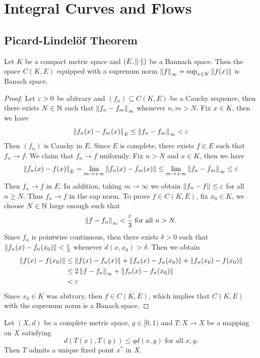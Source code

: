 \chapter{Integral Curves and Flows}
\section{Picard-Lindelöf Theorem}
\begin{lemma}
    Let $K$ be a compact metric space and $(E,\left\lVert \cdot \right\rVert)$ be a Bannach space. Then the space $C(K,E)$ equipped with a suprenum norm $\left\lVert f \right\rVert_{\infty} = \sup_{x \in K}\left\lVert f(x) \right\rVert$ is Banach space.
\end{lemma}
\begin{proof}
    Let $\varepsilon > 0$ be abitrary and $(f_n) \subseteq C(K,E)$ be a Cauchy sequence, then there exists $N \in \mathbb{N}$ such that $\left\lVert f_n - f_m \right\rVert_{\infty}$ whenever $n,m > N$. Fix $x \in K$, then we have 
    \[
        \left\lVert f_n(x) - f_m(x) \right\rVert_E \leq \left\lVert f_n - f_m \right\rVert_{\infty} < \varepsilon
    \]
    Then $(f_n)$ is Cauchy in $E$. Since $E$ is complete, there exists $f \in E$ such that $f_n \to f$. We claim that $f_n \to f$ uniformly. Fix $n > N$ and $x \in K$, then we have 
    \[
        \left\lVert f_n(x) - f(x) \right\rVert_{E} = \lim_{m \to +\infty}\left\lVert f_n(x) - f_m(x) \right\rVert\leq \lim_{m \to +\infty}\left\lVert f_n - f_m \right\rVert_{\infty} \leq \varepsilon
    \]
    Then $f_n \to f$ in $E$. In addition, taking $m \to \infty$ we obtain $\left\lVert f_n - f \right\rVert \leq \varepsilon$ for all $n \geq N$. Thus $f_n \to f$ in the sup norm. To prove $f \in C(K,E)$, fix $x_0 \in K$, we choose $N \in \mathbb{N}$ large enough such that 
    \[
        \left\lVert f -f_n \right\rVert_{\infty} < \frac{\varepsilon}{3} \text{ for all }n > N.
    \]
    Since $f_n$ is pointwise continuous, then there exists $\delta > 0$ such that $\left\lVert f_n(x) - f_n(x_0) \right\rVert< \frac{\varepsilon}{3}$ whenever $d(x,x_0) > \delta$. Then we obtain 
    \begin{align*}
        \left\lVert f(x) - f(x_0) \right\rVert &\leq \left\lVert f(x) - f_n(x) \right\rVert + \left\lVert f_n(x) - f_n(x_0) \right\rVert + \left\lVert f_n(x_0) - f(x_0) \right\rVert\\
        &\leq 2\left\lVert f - f_n \right\rVert_\infty + \left\lVert f_n(x) - f_n(x_0) \right\rVert\\
        &< \varepsilon
    \end{align*}
    Since $x_0 \in K$ was abitrary, then $f \in C(K,E)$, which implies that $C(K,E)$ with the suprenum norm is a Banach space.
\end{proof}
\begin{theorem}
    Let $(X,d)$ be a complete metric space, $q \in [0,1)$ and $T: X \to X$ be a mapping on $X$ satisfying
    \[
         d(T(x),T(y)) \leq qd(x,y) \text{ for all }x,y.
    \]
    Then $T$ admits a unique fixed point $x^*$ in $X$.
\end{theorem}
